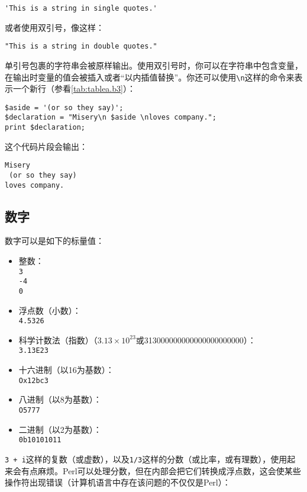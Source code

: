 \begin{lstlisting}
'This is a string in single quotes.'
\end{lstlisting}

或者使用双引号，像这样：

\begin{lstlisting}
"This is a string in double quotes."
\end{lstlisting}

单引号包裹的字符串会被原样输出。使用双引号时，你可以在字符串中包含变量，在输出时变量的值会被插入或者“以内插值替换”。你还可以使用\verb|\n|这样的命令来表示一个新行（参看\autoref{tab:tablea.b3}）：

\begin{lstlisting}
$aside = '(or so they say)';
$declaration = "Misery\n $aside \nloves company.";
print $declaration;
\end{lstlisting}

这个代码片段会输出：

\begin{lstlisting}
Misery 
 (or so they say) 
loves company.
\end{lstlisting}

\subsection{数字}
数字可以是如下的标量值：

\begin{itemize}
  \item 整数：\\ \verb|3|\\ \verb|-4|\\ \verb|0|
  \item 浮点数（小数）：\\ \verb|4.5326|
  \item 科学计数法（指数）（$3.13 \times 10^{23}$或313000000000000000000000）：\\ \verb|3.13E23|
  \item 十六进制（以16为基数）：\\ \verb|Ox12bc3|
  \item 八进制（以8为基数）：\\ \verb|O5777|
  \item 二进制（以2为基数）：\\ \verb|0b10101011|
\end{itemize}

\verb|3 + i|这样的复数（或虚数），以及\verb|1/3|这样的分数（或比率，或有理数），使用起来会有点麻烦。Perl可以处理分数，但在内部会把它们转换成浮点数，这会使某些操作符出现错误（计算机语言中存在该问题的不仅仅是Perl）：

